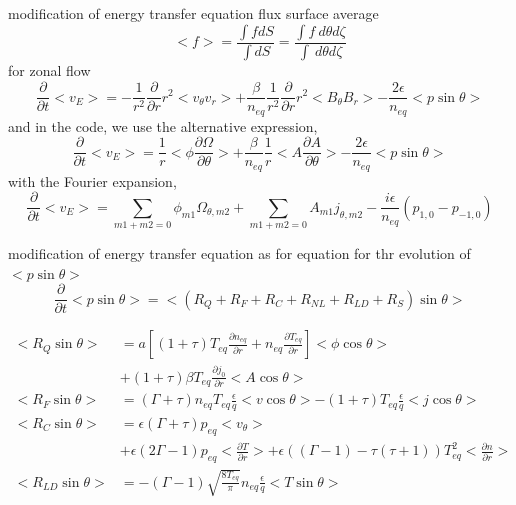 \documentclass{beamer}
\begin{document}
\begin{frame}{modification of energy transfer equation}
flux surface average
\begin{equation}
<f>=\frac{\int{f}dS}{\int{dS}}
=\frac{\int{f}\ d\theta{d\zeta}}{\int\ d\theta{d\zeta}}
\end{equation}
for zonal flow 
\begin{equation}
\frac{\partial}{\partial{t}}<v_E>
=-\frac{1}{r^2}\frac{\partial}{\partial{r}}r^2<v_\theta{v_r}>
+\frac{\beta}{n_{eq}}\frac{1}{r^2}\frac{\partial}{\partial{r}}r^2<B_\theta{B_r}>
-\frac{2\epsilon}{n_{eq}}<p\sin\theta>
\end{equation}
and in the code, we use the alternative expression,
\begin{equation}
\frac{\partial}{\partial{t}}<v_E>
=\frac{1}{r}<\phi\frac{\partial{\Omega}}{\partial\theta}>
+\frac{\beta}{n_{eq}}\frac{1}{r}<A\frac{\partial{A}}{\partial\theta}>
-\frac{2\epsilon}{n_{eq}}<p\sin\theta>
\end{equation} 
with the Fourier expansion,
\begin{equation}
\frac{\partial}{\partial{t}}<v_E>
=\sum_{m1+m2=0}{\phi_{m1}}{\Omega_{\theta,m2}}
+\sum_{m1+m2=0}{A_{m1}}{j_{\theta,m2}}
-\frac{i\epsilon}{n_{eq}}(p_{1,0}-p_{-1,0})
\end{equation} 
\end{frame}


\begin{frame}{modification of energy transfer equation}
as for equation for thr evolution of $<p\sin\theta>$
\begin{equation}
\frac{\partial}{\partial{t}}<p\sin\theta>
=<(R_Q+R_F+R_C+R_{NL}+R_{LD}+R_{S})\sin\theta>
\end{equation}

\begin{equation}
\begin{aligned}
<R_Q\sin\theta>&=
a[(1+\tau)T_{eq}\frac{\partial{n_{eq}}}{\partial{r}}+n_{eq}\frac{\partial{T_{eq}}}{\partial{r}}]<\phi\cos\theta>\\
&+(1+\tau)\beta{T_{eq}}\frac{\partial{j_0}}{\partial{r}}<A\cos\theta>\\
<R_F\sin\theta>&=
(\Gamma+\tau)n_{eq}T_{eq}\frac{\epsilon}{q}<v\cos\theta>
-(1+\tau)T_{eq}\frac{\epsilon}{q}<j\cos\theta>	\\
<R_C\sin\theta>&=
\epsilon(\Gamma+\tau)p_{eq}<v_\theta>	\\
&+\epsilon(2\Gamma-1)p_{eq}<\frac{\partial{T}}{\partial{r}}>
+\epsilon((\Gamma-1)-\tau(\tau+1))T_{eq}^2<\frac{\partial{n}}{\partial{r}}>	\\
<R_{LD}\sin\theta>&=
-(\Gamma-1)\sqrt{\frac{8T_{eq}}{\pi}}n_{eq}\frac{\epsilon}{q}<T\sin\theta>	\\
\end{aligned}
\end{equation}
\end{frame}	
\end{document}
